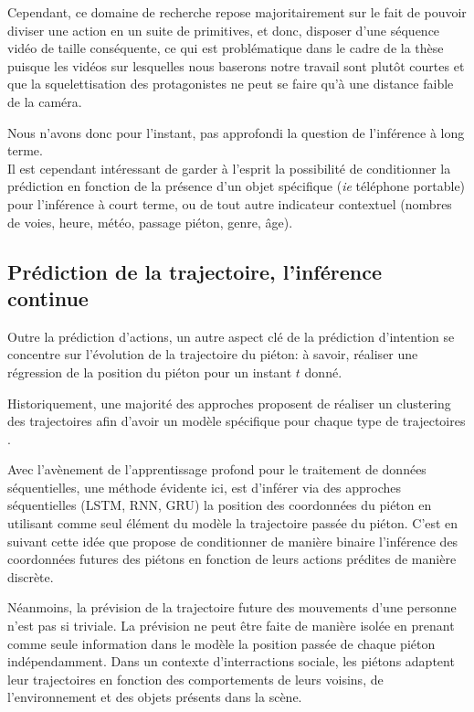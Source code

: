  Cependant, ce domaine de recherche repose majoritairement sur le fait de pouvoir diviser une action en un suite de primitives, et donc, disposer d'une séquence vidéo de taille conséquente, ce qui est problématique dans le cadre de la thèse puisque les vidéos sur lesquelles nous baserons notre travail sont plutôt courtes et que la squelettisation des protagonistes ne peut se faire qu'à une distance faible de la caméra.
 
 Nous n'avons donc pour l'instant, pas approfondi la question de l'inférence à long terme.\\
 Il est cependant intéressant de garder à l'esprit la possibilité de conditionner la prédiction en fonction de la présence d'un objet spécifique (\textit{ie} téléphone portable) pour l'inférence à court terme, ou de tout autre indicateur contextuel (nombres de voies, heure, météo, passage piéton, genre, âge).

\subsection{Prédiction de la trajectoire, l'inférence continue}

Outre la prédiction d'actions, un autre aspect clé de la prédiction d'intention se concentre sur l'évolution de la trajectoire du piéton: à savoir, réaliser une régression de la position du piéton pour un instant $t$ donné.

Historiquement, une majorité des approches proposent de réaliser un clustering des trajectoires afin d'avoir un modèle spécifique pour chaque type de trajectoires \cite{zhou2011random, morris2011trajectory, kim2011gaussian}.

Avec l'avènement de l'apprentissage profond pour le traitement de données séquentielles, une méthode évidente ici, est d'inférer via des approches séquentielles (LSTM, RNN, GRU) la position des coordonnées du piéton en utilisant comme seul élément du modèle la trajectoire passée du piéton. C'est en suivant cette idée que \cite{DBLP:phd/hal/Pop19} propose de conditionner de manière binaire l'inférence des coordonnées futures des piétons en fonction de leurs actions prédites de manière discrète.

Néanmoins, la prévision de la trajectoire future des mouvements d'une personne n'est pas si triviale. La prévision ne peut être faite de manière isolée en prenant comme seule information dans le modèle la position passée de chaque piéton indépendamment. Dans un contexte d'interractions sociale, les piétons adaptent leur trajectoires en fonction des comportements de leurs voisins, de l'environnement et des objets présents dans la scène.


